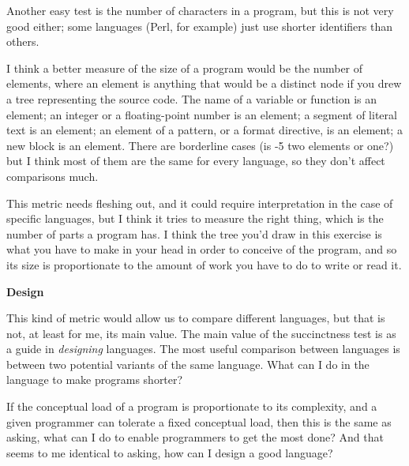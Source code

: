 Another easy test is the number of characters
                  in a program, but this is not very good either; some languages
                  (Perl, for example) just use shorter identifiers than
                  others.

I think a better measure of the size of a
                  program would be the number of elements, where an element is
                  anything that would be a distinct node if you drew a tree
                  representing the source code. The name of a variable or
                  function is an element; an integer or a floating-point number
                  is an element; a segment of literal text is an element; an
                  element of a pattern, or a format directive, is an element; a
                  new block is an element. There are borderline cases (is -5 two
                  elements or one?) but I think most of them are the same for
                  every language, so they don't affect comparisons much.

This
                  metric needs fleshing out, and it could require interpretation
                  in the case of specific languages, but I think it tries to
                  measure the right thing, which is the number of parts a
                  program has. I think the tree you'd draw in this exercise is
                  what you have to make in your head in order to conceive of the
                  program, and so its size is proportionate to the amount of
                  work you have to do to write or read it.

\textbf{Design}

This kind of metric would allow us to compare
                  different languages, but that is not, at least for me, its
                  main value. The main value of the succinctness test is as a
                  guide in \emph{designing} languages. The most useful
                  comparison between languages is between two potential variants
                  of the same language. What can I do in the language to make
                  programs shorter?

If the conceptual load of a
                  program is proportionate to its complexity, and a given
                  programmer can tolerate a fixed conceptual load, then this is
                  the same as asking, what can I do to enable programmers to get
                  the most done? And that seems to me identical to asking, how
                  can I design a good language?

